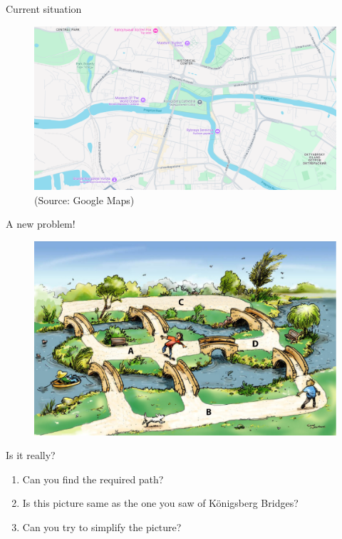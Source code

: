 \documentclass[mathserif]{beamer}
\begin{document}
\begin{frame}{Current situation}
    \begin{figure}
        \centering
        \includegraphics[scale=.3]{zoom.png}
        \caption{(Source: Google Maps)}
    \end{figure}
\end{frame}


\begin{frame}{A new problem!}
    \begin{figure}
        \centering
        \includegraphics[scale=.25]{map2.png}
    \end{figure}
\end{frame}

\begin{frame}{Is it really?}
    \begin{enumerate}
        \item  Can you find the required path?
        \item  Is this picture same as the one you saw of K\"{o}nigsberg Bridges? 
        \item Can you try to simplify the picture?
    \end{enumerate}
    \end{frame}
\end{document}
